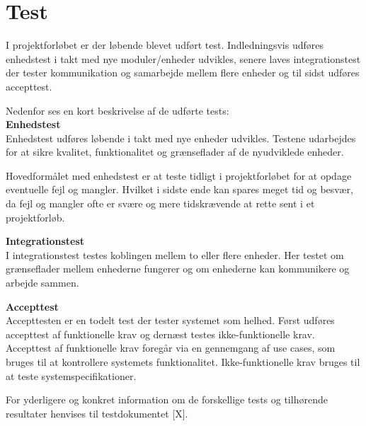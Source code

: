 \section{Test}

\label{chap:test}

I projektforløbet er der løbende blevet udført test. Indledningsvis udføres enhedstest i takt med nye moduler/enheder udvikles, senere laves integrationstest der tester kommunikation og samarbejde mellem flere enheder og til sidst udføres accepttest.

Nedenfor ses en kort beskrivelse af de udførte tests:\\


\textbf{Enhedstest} \\
Enhedstest udføres løbende i takt med nye enheder udvikles. Testene udarbejdes for at sikre kvalitet, funktionalitet og grænseflader af de nyudviklede enheder. 

Hovedformålet med enhedstest er at teste tidligt i projektforløbet for at opdage eventuelle fejl og mangler. Hvilket i sidste ende kan spares meget tid og besvær, da fejl og mangler ofte er svære og mere tidskrævende at rette sent i et projektforløb.


\textbf{Integrationstest} \\
I integrationstest testes koblingen mellem to eller flere enheder. Her testet om grænseflader mellem enhederne fungerer og om enhederne kan kommunikere og arbejde sammen.  



\textbf{Accepttest} \\
Accepttesten er en todelt test der tester systemet som helhed. 
Først udføres accepttest af funktionelle krav og dernæst testes ikke-funktionelle krav.
Accepttest af funktionelle krav foregår via en gennemgang af use cases, som bruges til at kontrollere systemets funktionalitet. Ikke-funktionelle krav bruges til at teste systemspecifikationer.  

For yderligere og konkret information om de forskellige tests og tilhørende resultater henvises til testdokumentet [X].